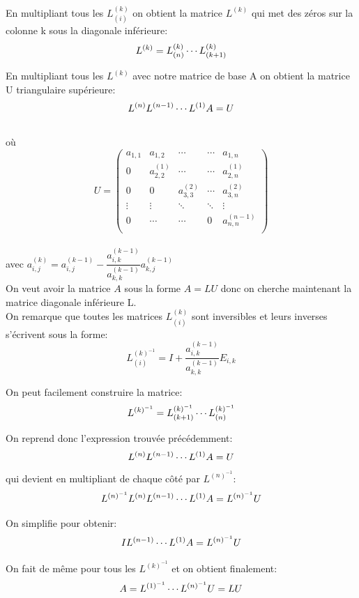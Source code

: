 \documentclass[a4paper,12pt]{report}
\begin{document}
En multipliant tous les $L_{(i)}^{(k)}$ on obtient la matrice $L^{(k)}$ qui met des zéros sur la colonne k sous la diagonale inférieure: \\
$$L^{(k)}=L_{(n)}^{(k)} \cdots\\ L_{(k+1)}^{(k)}$$

En multipliant tous les $L^{(k)}$ avec notre matrice de base A on obtient la matrice U triangulaire supérieure:
$$L^{(n)}L^{(n-1)}\cdots\\L^{(1)}A=U$$\\
où
$$ U=
\begin{pmatrix}
a_{1,1} & a_{1,2} & \cdots &\cdots & a_{1,n}\\
0 & a_{2,2}^{(1)} & \cdots & \cdots &a_{2,n}^{(1)}\\
0 & 0 & a_{3,3}^{(2)} & \cdots & a_{3,n}^{(2)}\\
\vdots & \vdots & \ddots & \ddots &\vdots \\
0 & \cdots & \cdots&0 & a_{n,n}^{(n-1)}\\

\end{pmatrix}$$\\

avec $a_{i,j}^{(k)}= a_{i,j}^{(k-1)}-\dfrac{a_{i,k}^{(k-1)}}{a_{k,k}^{(k-1)}}a_{k,j}^{(k-1)}$\\

On veut avoir la matrice $A$ sous la forme $A=LU$ donc on cherche maintenant la matrice diagonale inférieure L.\\

On remarque que toutes les matrices $L_{(i)}^{(k)}$ sont inversibles et leurs inverses s'écrivent sous la forme:
$$L_{(i)}^{(k)^{-1}}=I+\dfrac{a_{i,k}^{(k-1)}}{a_{k,k}^{(k-1)}}E_{i,k}$$

On peut facilement construire la matrice:$$L^{(k)^{-1}}=L_{(k+1)}^{(k)^{-1}}\cdots\\L_{(n)}^{(k)^{-1}}$$

On reprend donc l'expression trouvée précédemment:$$L^{(n)}L^{(n-1)}\cdots\\L^{(1)}A=U$$
qui devient en multipliant de chaque côté par $L^{(n)^{-1}}$:\\ $$L^{(n)^{-1}}L^{(n)}L^{(n-1)}\cdots\\L^{(1)}A=L^{(n)^{-1}}U$$

On simplifie pour obtenir:
$$IL^{(n-1)}\cdots\\L^{(1)}A=L^{(n)^{-1}}U$$

On fait de même pour tous les $L^{(k)^{-1}}$ et on obtient finalement:
$$A=L^{(1)^{-1}}\cdots\\L^{(n)^{-1}}U=LU$$\\
\end{document}
